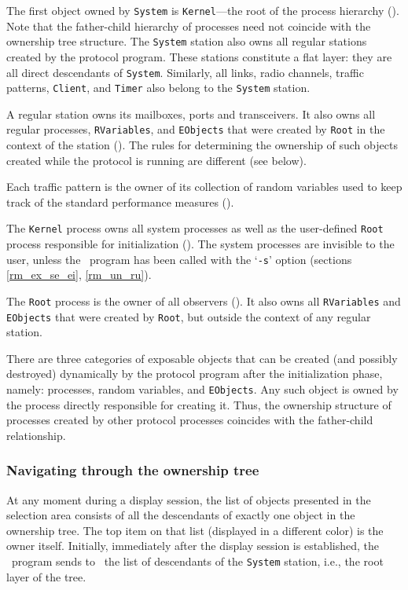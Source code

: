 The first object owned by {\tt System} is {\tt Kernel}---the root
of the process hierarchy ().
Note that the father-child hierarchy of processes
need not coincide with the ownership tree structure.
The {\tt System} station also owns all regular stations created by the 
protocol program.
These stations constitute a flat layer: they are all direct descendants
of {\tt System}.
Similarly, all links, radio channels,
traffic patterns, {\tt Client}, and {\tt Timer}
also belong to the {\tt System} station.

A regular station owns its mailboxes, ports and transceivers.
It also owns all regular processes, {\tt RVariables}, and {\tt EObjects}
that were created by {\tt Root}
in the context of the station ().
The rules for determining the ownership of such objects created
while the protocol is running are different (see below).

Each traffic pattern is the owner of its collection of random variables
used
to keep track of the standard performance measures ().

The {\tt Kernel} process owns all system processes as well as 
the user-defined {\tt Root} process responsible
for initialization ().
The system processes are invisible to the user,
unless the \smurph\ program has been
called with the `{\tt -s}' option (sections \ref{rm_ex_se_ei}, \ref{rm_un_ru}).

The {\tt Root} process is the owner of all observers ().
It also owns all
{\tt RVariables} and {\tt EObjects} that were created by
{\tt Root}, but outside the context of any regular station.

There are three categories of exposable objects that can be created (and
possibly destroyed) dynamically
by the protocol program after the initialization phase, namely:
processes, random variables, and {\tt EObjects}.
Any such object is owned by the process directly responsible for creating
it.
Thus, the ownership structure of processes created by other protocol
processes coincides with the father-child relationship.

\subsubsection{Navigating through the ownership tree}
\label{rm_ds_om_na}

At any moment during a display session, the list of objects presented in
the selection area consists of all the descendants of exactly
one object in the ownership tree.
The top item on that list (displayed in a different color) is the owner
itself.
Initially, immediately after the display session is established,
the \smurph\ program sends to \dsd\ the list of descendants of the
{\tt System} station, i.e., the root layer of the tree.

